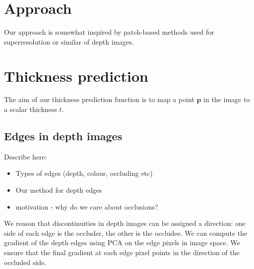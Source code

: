 \documentclass[10pt,twocolumn,letterpaper]{article}
\newcommand{\point}{\mathbf{p}}
\begin{document}
\section{Approach}

Our approach is somewhat inspired by patch-based methods used for superresolution or similar of depth images. 





\section{Thickness prediction}

The aim of our thickness prediction function is to map a point $\point$ in the image to a scalar thickness $t$.


\subsection{Edges in depth images}
Describe here:
\begin{itemize}
\item Types of edges (depth, colour, occluding etc)
\item Our method for depth edges
\item motivation - why do we care about occlusions?
\end{itemize}

We reason that discontinuities in depth images can be assigned a direction: one side of each edge is the occluder, the other is the occludee. 
We can compute the gradient of the depth edges using PCA on the edge pixels in image space.
We ensure that the final gradient at each edge pixel points in the direction of the occluded side.
\end{document}
